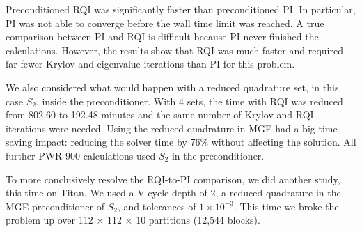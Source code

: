 \documentclass{article}                                                                           %
\begin{document}
Preconditioned RQI was significantly faster than preconditioned PI. In particular, PI was not able to converge before the wall time limit was reached. A true comparison between PI and RQI is difficult because PI never finished the calculations. However, the results show that RQI was much faster and required far fewer Krylov and eigenvalue iterations than PI for this problem. %

We also considered what would happen with a reduced quadrature set, in this case $S_{2}$, inside the preconditioner. With 4 sets, the time with RQI was reduced from 802.60 to 192.48 minutes and the same number of Krylov and RQI iterations were needed. Using the reduced quadrature in MGE had a big time saving impact: reducing the solver time by 76\% without affecting the solution. All further PWR 900 calculations used $S_{2}$ in the preconditioner.

To more conclusively resolve the RQI-to-PI comparison, we did another study, this time on Titan. We used a V-cycle depth of 2, a reduced quadrature in the MGE preconditioner of $S_2$, and tolerances of $1 \times 10^{-3}$. This time we broke the problem up over 112 $\times$ 112 $\times$ 10 partitions (12,544 blocks).
\end{document}
